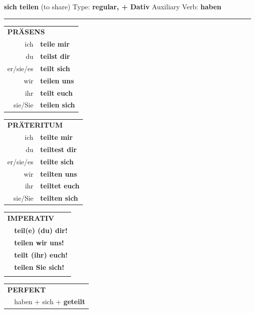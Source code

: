 \documentclass[10pt,a4paper]{revtex4-2}
\begin{document}
\begin{verbbox-dat}
    {\Large \bf sich teilen} (to share) \hfill Type: \textbf{regular, + Dativ} \hfill Auxiliary Verb: \textbf{haben} 
    
     \vspace{5pt}

    \hrule
    
    \vspace{5pt}

  \begin{tabular}{rl}
     \multicolumn{2}{l}{\textbf{PRÄSENS} }\\
    ich & \textbf{teile mir}\\
    du & \textbf{teilst dir}\\
    er/sie/es & \textbf{teilt sich}\\
    wir & \textbf{teilen uns}\\
    ihr & \textbf{teilt euch}\\
    sie/Sie & \textbf{teilen sich}\\
  \end{tabular}
  \hfill
     \begin{tabular}{rl}
    \multicolumn{2}{l}{\textbf{PRÄTERITUM} }\\
    ich & \textbf{teilte mir}\\
    du & \textbf{teiltest dir}\\
    er/sie/es & \textbf{teilte sich}\\
    wir & \textbf{teilten uns}\\
    ihr & \textbf{teiltet euch}\\
    sie/Sie & \textbf{teilten sich}\\
  \end{tabular}
  \hfill
  \begin{tabular}{rl}
     \multicolumn{2}{l}{\textbf{IMPERATIV} }\\
   & \textbf{teil(e) (du) dir!}\\
   & \textbf{teilen wir uns!}\\
   & \textbf{teilt (ihr) euch!}\\
   & \textbf{teilen Sie sich!}\\
   & \vspace{10pt}
  \end{tabular}

    \vspace{10pt}

 \begin{tabular}{rl}
     \multicolumn{2}{l}{\textbf{PERFEKT}}\\
    &haben + sich + \textbf{geteilt}\\
  \end{tabular}
\hfill
   \begin{tabular}{rl}
   

\end{tabular}
\end{verbbox-dat}
\end{document}
